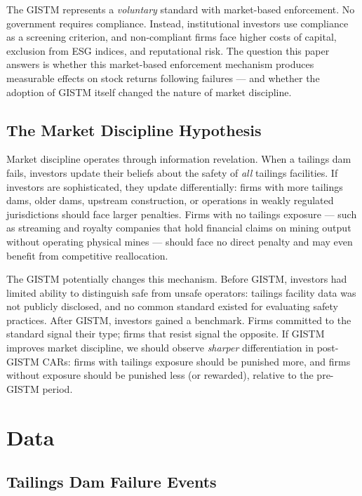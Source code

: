 \documentclass[12pt]{article}
\begin{document}
The GISTM represents a \emph{voluntary} standard with market-based enforcement. No government requires compliance. Instead, institutional investors use compliance as a screening criterion, and non-compliant firms face higher costs of capital, exclusion from ESG indices, and reputational risk. The question this paper answers is whether this market-based enforcement mechanism produces measurable effects on stock returns following failures --- and whether the adoption of GISTM itself changed the nature of market discipline.

\subsection{The Market Discipline Hypothesis}

Market discipline operates through information revelation. When a tailings dam fails, investors update their beliefs about the safety of \emph{all} tailings facilities. If investors are sophisticated, they update differentially: firms with more tailings dams, older dams, upstream construction, or operations in weakly regulated jurisdictions should face larger penalties. Firms with no tailings exposure --- such as streaming and royalty companies that hold financial claims on mining output without operating physical mines --- should face no direct penalty and may even benefit from competitive reallocation.

The GISTM potentially changes this mechanism. Before GISTM, investors had limited ability to distinguish safe from unsafe operators: tailings facility data was not publicly disclosed, and no common standard existed for evaluating safety practices. After GISTM, investors gained a benchmark. Firms committed to the standard signal their type; firms that resist signal the opposite. If GISTM improves market discipline, we should observe \emph{sharper} differentiation in post-GISTM CARs: firms with tailings exposure should be punished more, and firms without exposure should be punished less (or rewarded), relative to the pre-GISTM period.


\section{Data}\label{sec:data}

\subsection{Tailings Dam Failure Events}
\end{document}
